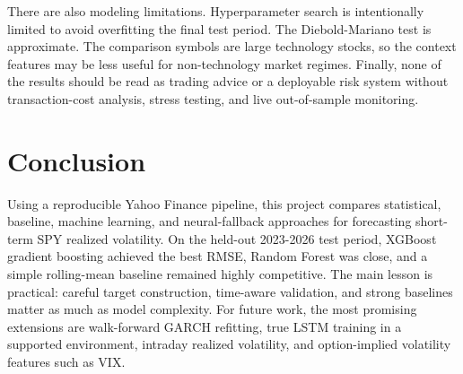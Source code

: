 \documentclass{article}
\begin{document}
There are also modeling limitations. Hyperparameter search is intentionally limited to avoid overfitting the final test period. The Diebold-Mariano test is approximate. The comparison symbols are large technology stocks, so the context features may be less useful for non-technology market regimes. Finally, none of the results should be read as trading advice or a deployable risk system without transaction-cost analysis, stress testing, and live out-of-sample monitoring.

\section{Conclusion}
Using a reproducible Yahoo Finance pipeline, this project compares statistical, baseline, machine learning, and neural-fallback approaches for forecasting short-term SPY realized volatility. On the held-out 2023-2026 test period, XGBoost gradient boosting achieved the best RMSE, Random Forest was close, and a simple rolling-mean baseline remained highly competitive. The main lesson is practical: careful target construction, time-aware validation, and strong baselines matter as much as model complexity. For future work, the most promising extensions are walk-forward GARCH refitting, true LSTM training in a supported environment, intraday realized volatility, and option-implied volatility features such as VIX.

\clearpage


\end{document}
